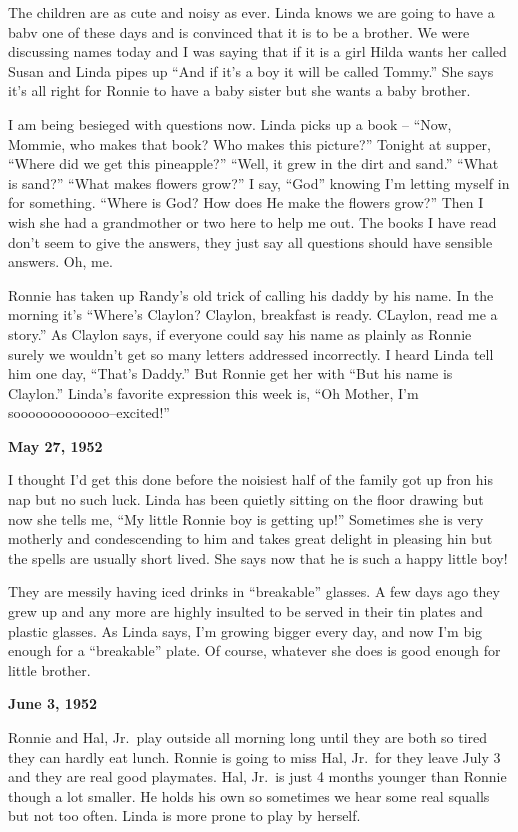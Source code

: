 \documentclass[]{book}
\begin{document}
The children are as cute and noisy as ever. Linda knows we are going to have a babv one of these days and is convinced that it is to be a brother. We were discussing names today and I was saying that if it is a girl Hilda wants her called Susan and Linda pipes up ``And if it's a boy it will be called Tommy.'' She says it's all right for Ronnie to have a baby sister but she wants a baby brother.

I am being besieged with questions now. Linda picks up a book -- ``Now, Mommie, who makes that book? Who makes this picture?'' Tonight at supper, ``Where did we get this pineapple?'' ``Well, it grew in the dirt and sand.'' ``What is sand?'' ``What makes flowers grow?'' I say, ``God'' knowing I'm letting myself in for something. ``Where is God? How does He make the flowers grow?'' Then I wish she had a grandmother or two here to help me out. The books I have read don't seem to give the answers, they just say all questions should have sensible answers. Oh, me.

Ronnie has taken up Randy's old trick of calling his daddy by his name. In the morning it's ``Where's Claylon? Claylon, breakfast is ready. CLaylon, read me a story.'' As Claylon says, if everyone could say his name as plainly as Ronnie surely we wouldn't get so many letters addressed incorrectly. I heard Linda tell him one day, ``That's Daddy.'' But Ronnie get her with ``But his name is Claylon.'' Linda's favorite expression this week is, ``Oh Mother, I'm sooooooooooooo--excited!''

\textbf{May 27, 1952}

I thought I'd get this done before the noisiest half of the family got up fron his nap but no such luck. Linda has been quietly sitting on the floor drawing but now she tells me, ``My little Ronnie boy is getting up!'' Sometimes she is very motherly and condescending to him and takes great delight in pleasing hin but the spells are usually short lived. She says now that he is such a happy little boy!

They are messily having iced drinks in ``breakable'' glasses. A few days ago they grew up and any more are highly insulted to be served in their tin plates and plastic glasses. As Linda says, I'm growing bigger
every day, and now I'm big enough for a ``breakable'' plate. Of course, whatever she does is good enough for little brother.

\textbf{June 3, 1952}

Ronnie and Hal, Jr.~play outside all morning long until they are both so tired they can hardly eat lunch. Ronnie is going to miss Hal, Jr.~for they leave July 3 and they are real good playmates. Hal, Jr.~is just 4 months younger than Ronnie though a lot smaller. He holds his own so sometimes we hear some real squalls but not too often. Linda is more prone to play by herself.
\end{document}
